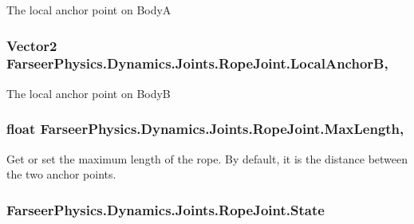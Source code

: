 The local anchor point on Body\+A 

\hypertarget{class_farseer_physics_1_1_dynamics_1_1_joints_1_1_rope_joint_ad40a4d81d4f0ed393fd4dbd0e90cf683}{
\subsubsection[{Local\+Anchor\+B}]{\setlength{\rightskip}{0pt plus 5cm}Vector2 Farseer\+Physics.\+Dynamics.\+Joints.\+Rope\+Joint.\+Local\+Anchor\+B\hspace{0.3cm}{\ttfamily [get]}, {\ttfamily [set]}}}\label{class_farseer_physics_1_1_dynamics_1_1_joints_1_1_rope_joint_ad40a4d81d4f0ed393fd4dbd0e90cf683}


The local anchor point on Body\+B 

\hypertarget{class_farseer_physics_1_1_dynamics_1_1_joints_1_1_rope_joint_a59a02f46e4bc67c7d640c0c3c4d2667b}{
\subsubsection[{Max\+Length}]{\setlength{\rightskip}{0pt plus 5cm}float Farseer\+Physics.\+Dynamics.\+Joints.\+Rope\+Joint.\+Max\+Length\hspace{0.3cm}{\ttfamily [get]}, {\ttfamily [set]}}}\label{class_farseer_physics_1_1_dynamics_1_1_joints_1_1_rope_joint_a59a02f46e4bc67c7d640c0c3c4d2667b}


Get or set the maximum length of the rope. By default, it is the distance between the two anchor points. 

\hypertarget{class_farseer_physics_1_1_dynamics_1_1_joints_1_1_rope_joint_a185d4fe67134b08e33113cf5f321d4ba}{
\subsubsection[{State}]{ Farseer\+Physics.\+Dynamics.\+Joints.\+Rope\+Joint.\+State\hspace{0.3cm}{\ttfamily [get]}}}\label{class_farseer_physics_1_1_dynamics_1_1_joints_1_1_rope_joint_a185d4fe67134b08e33113cf5f321d4ba}


